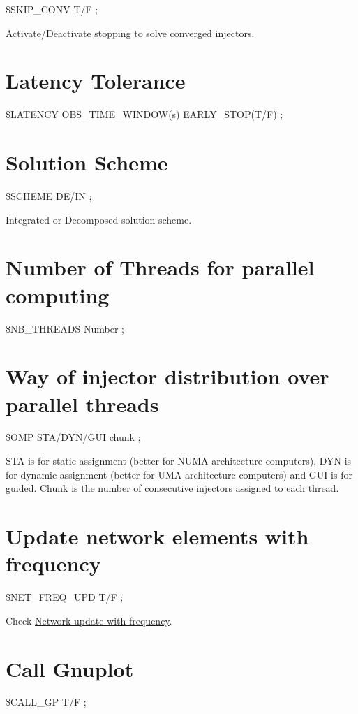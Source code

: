 \$SKIP\_CONV T/F ; 

Activate/Deactivate stopping to solve converged injectors.


\section{Latency Tolerance}

 \$LATENCY OBS\_TIME\_WINDOW(s) EARLY\_STOP(T/F)
	; 


\section{Solution Scheme}

 \$SCHEME DE/IN ; 

Integrated or Decomposed solution scheme.


\section{Number of Threads for parallel computing}

 \$NB\_THREADS Number ;


\section{Way of injector distribution over parallel
	threads}

 \$OMP STA/DYN/GUI chunk ;

STA is for static assignment (better for NUMA architecture computers),
DYN is for dynamic assignment (better for UMA architecture computers)
and GUI is for guided. Chunk is the number of consecutive injectors
assigned to each thread.


\section{Update network elements with frequency}

 \$NET\_FREQ\_UPD T/F ;

Check \href{file:models/freq_upd_vminmax.pdf}{Network update with frequency}.


\section{Call Gnuplot}

 \$CALL\_GP T/F ;

